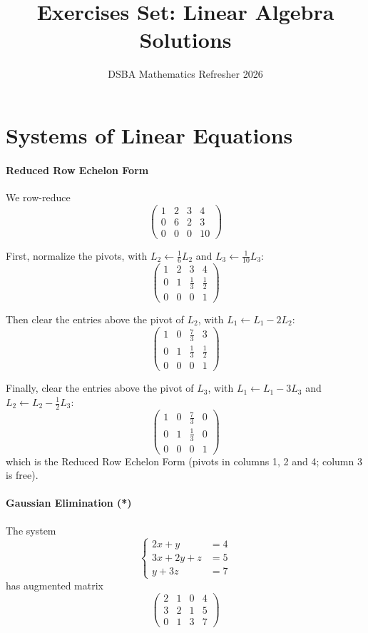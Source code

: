 \documentclass[]{article}
\title{Exercises Set: Linear Algebra\\ \large Solutions}
\author{DSBA Mathematics Refresher 2026}
\date{}
\begin{document}
	\maketitle

	\section{Systems of Linear Equations}
	\paragraph{Reduced Row Echelon Form}\mbox{}

	We row-reduce
	$$\begin{pmatrix}
		1 & 2 & 3 & 4\\
		0 & 6 & 2 & 3\\
		0 & 0 & 0 & 10
	\end{pmatrix}$$

	First, normalize the pivots, with $L_2 \leftarrow \frac{1}{6} L_2$ and $L_3 \leftarrow \frac{1}{10} L_3$:
	$$\begin{pmatrix}
		1 & 2 & 3 & 4\\
		0 & 1 & \frac{1}{3} & \frac{1}{2}\\
		0 & 0 & 0 & 1
	\end{pmatrix}$$

	Then clear the entries above the pivot of $L_2$, with $L_1 \leftarrow L_1 - 2 L_2$:
	$$\begin{pmatrix}
		1 & 0 & \frac{7}{3} & 3\\
		0 & 1 & \frac{1}{3} & \frac{1}{2}\\
		0 & 0 & 0 & 1
	\end{pmatrix}$$

	Finally, clear the entries above the pivot of $L_3$, with $L_1 \leftarrow L_1 - 3 L_3$ and $L_2 \leftarrow L_2 - \frac{1}{2} L_3$:
	$$\begin{pmatrix}
		1 & 0 & \frac{7}{3} & 0\\
		0 & 1 & \frac{1}{3} & 0\\
		0 & 0 & 0 & 1
	\end{pmatrix}$$
	which is the Reduced Row Echelon Form (pivots in columns 1, 2 and 4; column 3 is free).

	\paragraph{Gaussian Elimination (*)}\mbox{}

	The system
	$$\begin{cases}
		2x + y &= 4 \\
		3x + 2y + z &= 5 \\
		y + 3z &= 7
	\end{cases}$$
	has augmented matrix
	$$\left(\begin{array}{ccc|c}
		2 & 1 & 0 & 4\\
		3 & 2 & 1 & 5\\
		0 & 1 & 3 & 7
	\end{array}\right)$$
\end{document}

